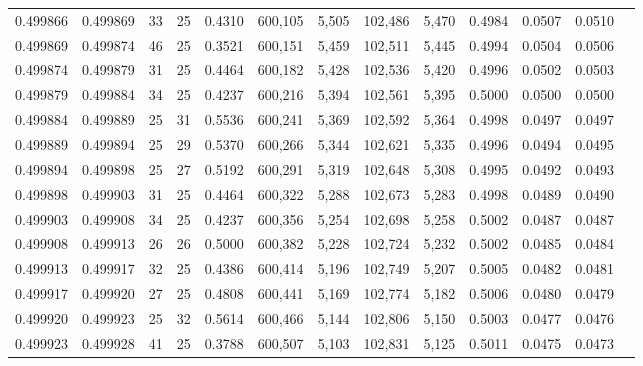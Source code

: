\begin{tabular}{rrrrrrrrrrrrr}
0.499866 & 0.499869 &    33 &  25 &                                     0.4310 & 600,105 &   5,505 & 102,486 &   5,470 & 0.4984 & 0.0507 & 0.0510 \\
0.499869 & 0.499874 &    46 &  25 &                                     0.3521 & 600,151 &   5,459 & 102,511 &   5,445 & 0.4994 & 0.0504 & 0.0506 \\
0.499874 & 0.499879 &    31 &  25 &                                     0.4464 & 600,182 &   5,428 & 102,536 &   5,420 & 0.4996 & 0.0502 & 0.0503 \\
0.499879 & 0.499884 &    34 &  25 &                                     0.4237 & 600,216 &   5,394 & 102,561 &   5,395 & 0.5000 & 0.0500 & 0.0500 \\
0.499884 & 0.499889 &    25 &  31 &                                     0.5536 & 600,241 &   5,369 & 102,592 &   5,364 & 0.4998 & 0.0497 & 0.0497 \\
0.499889 & 0.499894 &    25 &  29 &                                     0.5370 & 600,266 &   5,344 & 102,621 &   5,335 & 0.4996 & 0.0494 & 0.0495 \\
0.499894 & 0.499898 &    25 &  27 &                                     0.5192 & 600,291 &   5,319 & 102,648 &   5,308 & 0.4995 & 0.0492 & 0.0493 \\
0.499898 & 0.499903 &    31 &  25 &                                     0.4464 & 600,322 &   5,288 & 102,673 &   5,283 & 0.4998 & 0.0489 & 0.0490 \\
0.499903 & 0.499908 &    34 &  25 &                                     0.4237 & 600,356 &   5,254 & 102,698 &   5,258 & 0.5002 & 0.0487 & 0.0487 \\
0.499908 & 0.499913 &    26 &  26 &                                     0.5000 & 600,382 &   5,228 & 102,724 &   5,232 & 0.5002 & 0.0485 & 0.0484 \\
0.499913 & 0.499917 &    32 &  25 &                                     0.4386 & 600,414 &   5,196 & 102,749 &   5,207 & 0.5005 & 0.0482 & 0.0481 \\
0.499917 & 0.499920 &    27 &  25 &                                     0.4808 & 600,441 &   5,169 & 102,774 &   5,182 & 0.5006 & 0.0480 & 0.0479 \\
0.499920 & 0.499923 &    25 &  32 &                                     0.5614 & 600,466 &   5,144 & 102,806 &   5,150 & 0.5003 & 0.0477 & 0.0476 \\
0.499923 & 0.499928 &    41 &  25 &                                     0.3788 & 600,507 &   5,103 & 102,831 &   5,125 & 0.5011 & 0.0475 & 0.0473 \\

\end{tabular}
